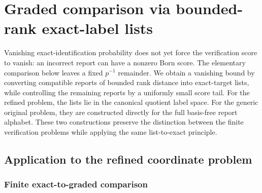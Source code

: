 \documentclass[11pt]{article}
\newcommand{\1}{\mathbf 1}
\theoremstyle{plain}
\theoremstyle{definition}
\theoremstyle{remark}
\begin{document}
\section{Graded comparison via bounded-rank exact-label lists}
\label{sec:integrated-all-prime-graded}
Vanishing exact-identification probability does not yet force the
verification score to vanish: an incorrect report can have a nonzero Born
score.  The elementary comparison below leaves a fixed $p^{-1}$ remainder.
We obtain a vanishing bound by converting compatible reports of bounded rank
distance into exact-target lists, while controlling the remaining reports by
a uniformly small score tail.  For the refined problem, the lists lie in the
canonical quotient label space.  For the generic original problem, they are
constructed directly for the full basis-free report alphabet.  These two
constructions preserve the distinction between the finite verification
problems while applying the same list-to-exact principle.

\subsection{Application to the refined coordinate problem}
\label{subsec:graded-refined-application}

\subsubsection{Finite exact-to-graded comparison}
\label{subsec:graded-finite-sandwich}
\end{document}

